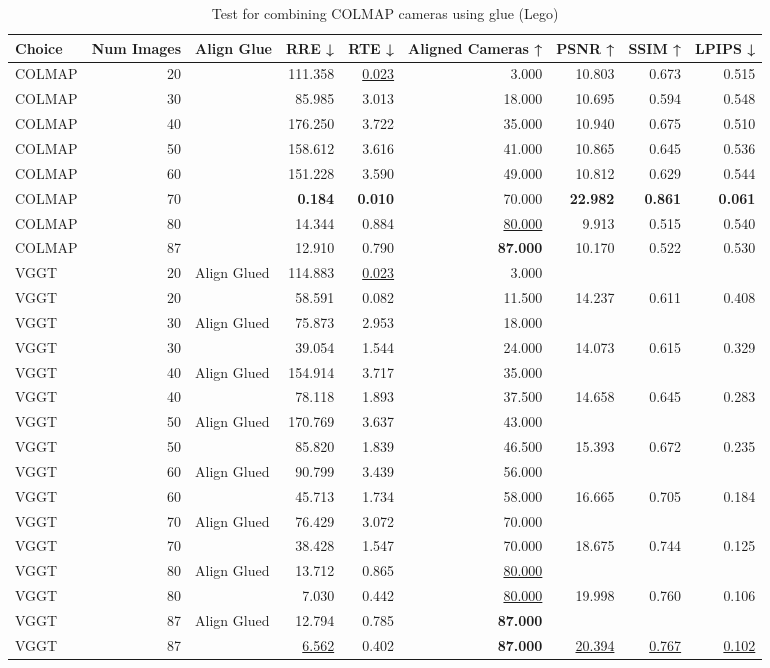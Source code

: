 \begin{table}[H]
\caption{Test for combining COLMAP cameras using glue (Lego)}
\label{tab:99_align_glue_lego}
\begin{tabular}{lrlrrrrrr}
\toprule
Choice & Num Images & Align Glue & RRE ↓ & RTE ↓ & Aligned Cameras ↑ & PSNR ↑ & SSIM ↑ & LPIPS ↓ \\
\midrule
COLMAP & 20 &  & 111.358 & \underline{0.023} & 3.000 & 10.803 & 0.673 & 0.515 \\
COLMAP & 30 &  & 85.985 & 3.013 & 18.000 & 10.695 & 0.594 & 0.548 \\
COLMAP & 40 &  & 176.250 & 3.722 & 35.000 & 10.940 & 0.675 & 0.510 \\
COLMAP & 50 &  & 158.612 & 3.616 & 41.000 & 10.865 & 0.645 & 0.536 \\
COLMAP & 60 &  & 151.228 & 3.590 & 49.000 & 10.812 & 0.629 & 0.544 \\
COLMAP & 70 &  & \textbf{0.184} & \textbf{0.010} & 70.000 & \textbf{22.982} & \textbf{0.861} & \textbf{0.061} \\
COLMAP & 80 &  & 14.344 & 0.884 & \underline{80.000} & 9.913 & 0.515 & 0.540 \\
COLMAP & 87 &  & 12.910 & 0.790 & \textbf{87.000} & 10.170 & 0.522 & 0.530 \\
VGGT & 20 & Align Glued & 114.883 & \underline{0.023} & 3.000 &  &  &  \\
VGGT & 20 &  & 58.591 & 0.082 & 11.500 & 14.237 & 0.611 & 0.408 \\
VGGT & 30 & Align Glued & 75.873 & 2.953 & 18.000 &  &  &  \\
VGGT & 30 &  & 39.054 & 1.544 & 24.000 & 14.073 & 0.615 & 0.329 \\
VGGT & 40 & Align Glued & 154.914 & 3.717 & 35.000 &  &  &  \\
VGGT & 40 &  & 78.118 & 1.893 & 37.500 & 14.658 & 0.645 & 0.283 \\
VGGT & 50 & Align Glued & 170.769 & 3.637 & 43.000 &  &  &  \\
VGGT & 50 &  & 85.820 & 1.839 & 46.500 & 15.393 & 0.672 & 0.235 \\
VGGT & 60 & Align Glued & 90.799 & 3.439 & 56.000 &  &  &  \\
VGGT & 60 &  & 45.713 & 1.734 & 58.000 & 16.665 & 0.705 & 0.184 \\
VGGT & 70 & Align Glued & 76.429 & 3.072 & 70.000 &  &  &  \\
VGGT & 70 &  & 38.428 & 1.547 & 70.000 & 18.675 & 0.744 & 0.125 \\
VGGT & 80 & Align Glued & 13.712 & 0.865 & \underline{80.000} &  &  &  \\
VGGT & 80 &  & 7.030 & 0.442 & \underline{80.000} & 19.998 & 0.760 & 0.106 \\
VGGT & 87 & Align Glued & 12.794 & 0.785 & \textbf{87.000} &  &  &  \\
VGGT & 87 &  & \underline{6.562} & 0.402 & \textbf{87.000} & \underline{20.394} & \underline{0.767} & \underline{0.102} \\
\bottomrule
\end{tabular}
\end{table}
